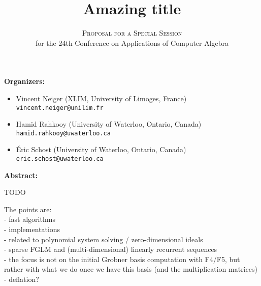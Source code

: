 \documentclass[12pt,english]{article}
\title{Amazing title}
\author{\textsc{Proposal for a Special Session} \\
  for the 24th Conference on Applications of Computer Algebra}
\date{}
\begin{document}
\maketitle

\textbf{Organizers:}
\begin{itemize}
  \item Vincent Neiger (XLIM, University of Limoges, France) \\
    {\small \verb+vincent.neiger@unilim.fr+}
  \item Hamid Rahkooy (University of Waterloo, Ontario, Canada) \\
    {\small \verb+hamid.rahkooy@uwaterloo.ca+}
  \item \'Eric Schost (University of Waterloo, Ontario, Canada) \\
    {\small \texttt{eric.schost@uwaterloo.ca}}
\end{itemize}

\textbf{Abstract:}

TODO

\bigskip

The points are: \\
  - fast algorithms \\
  - implementations \\
  - related to polynomial system solving / zero-dimensional ideals \\
  - sparse FGLM and (multi-dimensional) linearly recurrent sequences \\
  - the focus is not on the initial Grobner basis computation with F4/F5, but rather with what we do once we have this basis (and the multiplication matrices) \\
  - deflation?
\end{document}
